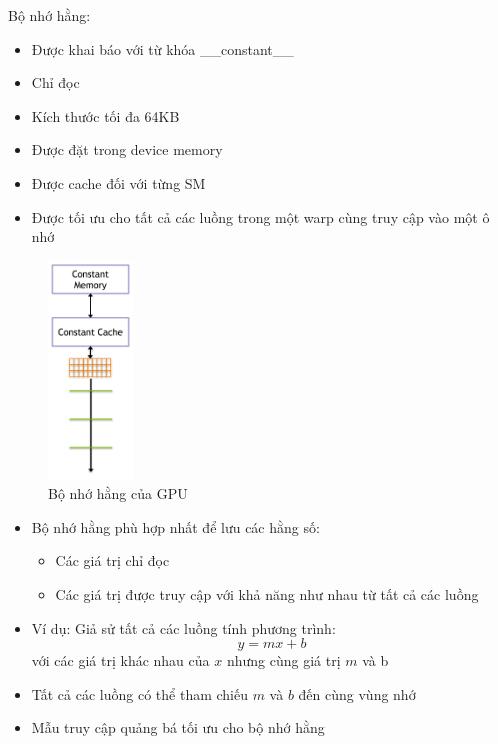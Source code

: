 \documentclass[14pt, a4paper]{article}
\numberwithin{equation}{section}
\numberwithin{figure}{section}
\numberwithin{dl}{section}
\numberwithin{md}{section}
\numberwithin{bd}{section}
\numberwithin{dn}{section}
\numberwithin{hq}{section}
\begin{document}
Bộ nhớ hằng:

\begin{itemize}
    \item Được khai báo với từ khóa \_\_constant\_\_
    \item Chỉ đọc 
    \item Kích thước tối đa 64KB
    \item Được đặt trong device memory
    \item Được cache đối với từng SM
    \item Được tối ưu cho tất cả các luồng trong một warp cùng truy cập vào một ô nhớ
\end{itemize}

\begin{figure}[H]
    \centering
    \includegraphics[width=0.2\textwidth]{figures/CUDA/GPU_Constant_Memory.png} 
    \caption{Bộ nhớ hằng của GPU}
\end{figure}

\begin{itemize}
    \item Bộ nhớ hằng phù hợp nhất để lưu các hằng số:
    \begin{itemize}
        \item Các giá trị chỉ đọc 
        \item Các giá trị được truy cập với khả năng như nhau từ tất cả các luồng
    \end{itemize}
    \item Ví dụ: Giả sử tất cả các luồng tính phương trình:
    \begin{equation*}
        y = m x + b
    \end{equation*}
    với các giá trị khác nhau của $x$ nhưng cùng giá trị $m$ và b
    \item Tất cả các luồng có thể tham chiếu $m$ và $b$ đến cùng vùng nhớ
    \item Mẫu truy cập quảng bá tối ưu cho bộ nhớ hằng
\end{itemize}
\end{document}
